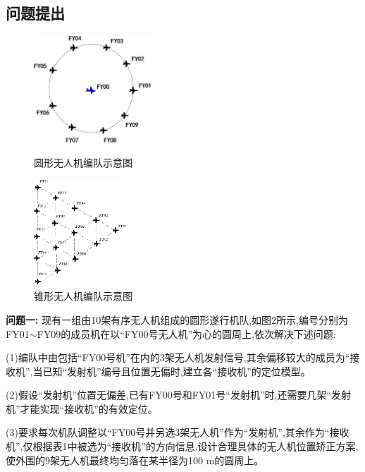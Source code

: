 \documentclass[withoutpreface,bwprint]{cumcmthesis} %
\begin{document}
	\subsection{问题提出}
	\begin{figure}[!htpb]
		\begin{minipage}{0.48\linewidth}
			\centering
			\includegraphics[height=4cm]{./figures/1-2.png}
			\caption{圆形无人机编队示意图}\label{fig:2}
		\end{minipage}
		\begin{minipage}{0.48\linewidth}
			\centering
	 		\includegraphics[height=4cm]{./figures/1-3.png}
	    	\caption{锥形无人机编队示意图}\label{fig:3}
		\end{minipage}
	\end{figure}	
	
	\noindent\textbf{问题一:}
    	现有一组由10架有序无人机组成的圆形遂行机队,如图2所示,编号分别为FY01$\sim$FY09的成员机在以“FY00号无人机”为心的圆周上,依次解决下述问题:
	
		(1)编队中由包括“FY00号机”在内的3架无人机发射信号,其余偏移较大的成员为“接收机”,当已知“发射机”编号且位置无偏时,建立各“接收机”的定位模型。
		
		(2)假设“发射机”位置无偏差,已有FY00号和FY01号“发射机”时,还需要几架“发射机”才能实现“接收机”的有效定位。%
		
		(3)要求每次机队调整以“FY00号并另选3架无人机”作为“发射机”,其余作为“接收机”,仅根据表1中被选为“接收机”的方向信息,设计合理具体的无人机位置矫正方案,使外围的9架无人机最终均匀落在某半径为100 m的圆周上。
	
		
\end{document}
